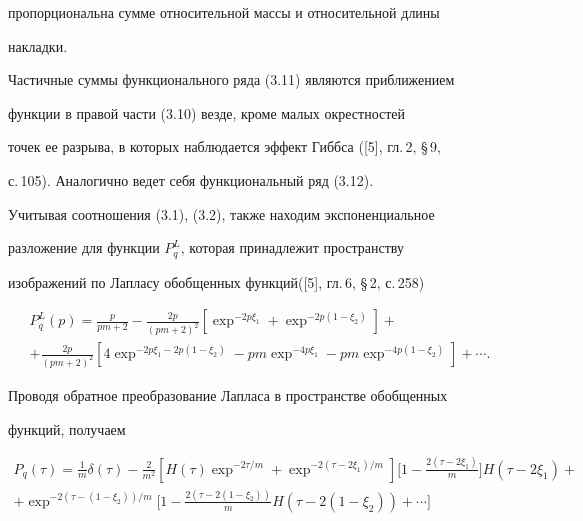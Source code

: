 пропорциональна сумме относительной массы и относительной длины


накладки.








Частичные суммы функционального ряда (3.11) являются приближением


функции в правой части (3.10) везде, кроме малых окрестностей


точек ее разрыва, в которых наблюдается эффект Гиббса ([5], гл.\,2, \S\,9,


с.\,105). Аналогично ведет себя функциональный ряд (3.12).





Учитывая соотношения (3.1), (3.2), также находим экспоненциальное


разложение для функции $P_{q}^{L}$, которая принадлежит пространству


изображений по Лапласу обобщенных функций([5], гл.\,6, \S\,2, с.\,258)


\begin{multline*}


P_{q}^{L}(p)=\frac{p}{pm+2}-


\frac{2p}{(pm+2)^2}[\exp^{-2p\xi_1}+


\exp^{-2p(1-\xi_2)}]+ \\


+\frac{2p}{(pm+2)^2}[4\exp^{-2p\xi_1-2p(1-\xi_2)}-


pm\exp^{-4p\xi_1}-pm\exp^{-4p(1-\xi_2)}]+\dotsb.


\end{multline*}





Проводя обратное преобразование Лапласа в пространстве обобщенных


функций, получаем


\begin{multline}


P_{q}(\tau)=\frac{1}{m} \delta(\tau)-\frac{2}{m^2}


[H(\tau)\exp^{-2\tau /m}+


\exp^{-2(\tau-2\xi_1)/m}] \bigg[1-


\frac{2(\tau-2\xi_1)}{m}\bigg]H(\tau-2\xi_1)+ \\


+\exp^{-2(\tau-(1-\xi_2))/m}\bigg[1-\frac{2(\tau-2(1-\xi_2))}


{m}H(\tau-2(1-\xi_2))+\dotsb\bigg]


\tag{3.13}


\end{multline}


